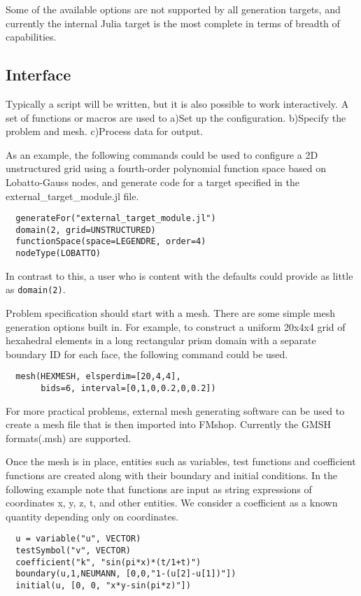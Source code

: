 \documentclass[twoside,leqno,twocolumn]{article}
\begin{document}
Some of the available options are not supported by all generation targets, and currently the internal Julia target is the most complete in terms of breadth of capabilities. 

\subsection{Interface}
Typically a script will be written, but it is also possible to work interactively. A set of functions or macros are used to a)Set up the configuration. b)Specify the problem and mesh. c)Process data for output.

As an example, the following commands could be used to configure a 2D unstructured grid using a fourth-order polynomial function space based on Lobatto-Gauss nodes, and generate code for a target specified in the external\_target\_module.jl file.
\begin{verbatim}
  generateFor("external_target_module.jl")
  domain(2, grid=UNSTRUCTURED)
  functionSpace(space=LEGENDRE, order=4)
  nodeType(LOBATTO)
\end{verbatim}
In contrast to this, a user who is content with the defaults could provide as little as \texttt{domain(2)}.

Problem specification should start with a mesh. There are some simple mesh generation options built in. For example, to construct a uniform 20x4x4 grid of hexahedral elements in a long rectangular prism domain with a separate boundary ID for each face, the following command could be used.
\begin{verbatim}
  mesh(HEXMESH, elsperdim=[20,4,4], 
       bids=6, interval=[0,1,0,0.2,0,0.2])
\end{verbatim}
For more practical problems, external mesh generating software can be used to create a mesh file that is then imported into FMshop. Currently the GMSH formats(.msh) are supported.

Once the mesh is in place, entities such as variables, test functions and coefficient functions are created along with their boundary and initial conditions. In the following example note that functions are input as string expressions of coordinates x, y, z, t, and other entities. We consider a coefficient as a known quantity depending only on coordinates.
\begin{verbatim}
  u = variable("u", VECTOR)
  testSymbol("v", VECTOR)
  coefficient("k", "sin(pi*x)*(t/1+t)")
  boundary(u,1,NEUMANN, [0,0,"1-(u[2]-u[1])"])
  initial(u, [0, 0, "x*y-sin(pi*z)"])
\end{verbatim}
\end{document}
